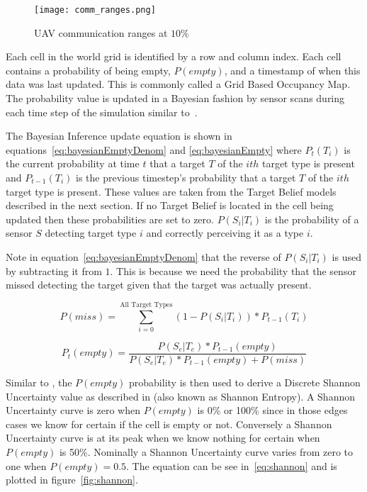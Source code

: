 \begin{figure}[H]
	\centering
	\texttt{[image: comm\_ranges.png]}
	\caption{UAV communication ranges at $10\%$}
	\label{fig:comm_ranges}
\end{figure}

Each cell in the world grid is identified by a row and column index.  Each cell contains a probability of being empty, $P(empty)$, and a timestamp of when this data was last updated.  This is commonly called a Grid Based Occupancy Map. The probability value is updated in a Bayesian fashion by sensor scans during each time step of the simulation similar to~\citet{waharte}.  
	
The Bayesian Inference update equation is shown in equations~\ref{eq:bayesianEmptyDenom} and \ref{eq:bayesianEmpty} where $P_{t}(T_{i})$ is the current probability at time $t$ that a target $T$ of the $ith$ target type is present and  $P_{t-1}(T_{i})$ is the previous timestep's probability that a target $T$ of the $ith$ target type is present.  These values are taken from the Target Belief models described in the next section.  If no Target Belief is located in the cell being updated then these probabilities are set to zero.  $P(S_{i}|T_{i})$ is the probability of a sensor $S$ detecting target type $i$ and correctly perceiving it as a type $i$.  

Note in equation~\ref{eq:bayesianEmptyDenom} that the reverse of $P(S_{i}|T_{i})$ is used by subtracting it from $1$.  This is because we need the probability that the sensor missed detecting the target given that the target was actually present.  

\begin{equation}
\label{eq:bayesianEmptyDenom}
P(miss) = \sum_{i=0}^{\text{All Target Types}} (1 - P(S_{i}|T_{i})) * P_{t-1}(T_{i})
\end{equation}

\begin{equation}
\label{eq:bayesianEmpty}
P_{t}(empty) = \frac{P(S_{e}|T_{e})*P_{t-1}(empty)}{ P(S_{e}|T_{e})*P_{t-1}(empty) + P(miss)}
\end{equation}


Similar to \citet{jin}, the $P(empty)$ probability is then used to derive a Discrete Shannon Uncertainty value as described in \citet{shannon} (also known as Shannon Entropy).  A Shannon Uncertainty curve is zero when $P(empty)$ is 0\% or 100\% since in those edges cases we know for certain if the cell is empty or not.  Conversely a Shannon Uncertainty curve is at its peak when we know nothing for certain when $P(empty)$ is 50\%.  Nominally a Shannon Uncertainty curve varies from zero to one when $P(empty) = 0.5$. The equation can be see in~\ref{eq:shannon} and is plotted in figure~\ref{fig:shannon}.
	
